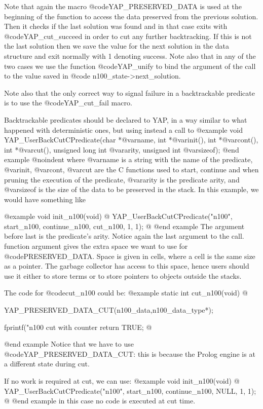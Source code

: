 {{{{{{{{{Note that again the macro @code{YAP_PRESERVED_DATA} is used at the
beginning of the function to access the data preserved from the previous
solution.  Then it checks if the last solution was found and in that
case exits with @code{YAP_cut_succeed} in order to cut any further
backtracking.  If this is not the last solution then we save the value
for the next solution in the data structure and exit normally with 1
denoting success. Note also that in any of the two cases we use the
function @code{YAP_unify} to bind the argument of the call to the value
saved in @code{ n100_state->next_solution}.


Note also that the only correct way to signal failure in a backtrackable
predicate is to use the @code{YAP_cut_fail} macro.

Backtrackable predicates should be declared to YAP, in a way
similar to what happened with deterministic ones, but using instead a
call to
@example
      void YAP_UserBackCutCPredicate(char *@var{name},
                 int *@var{init}(), int *@var{cont}(), int *@var{cut}(),
                 unsigned long int @var{arity}, unsigned int @var{sizeof});
@end example
@noindent
where @var{name} is a string with the name of the predicate, @var{init},
@var{cont}, @var{cut} are the C functions used to start, continue and
when pruning the execution of the predicate, @var{arity} is the
predicate arity, and @var{sizeof} is the size of the data to be
preserved in the stack. In this example, we would have something like

@example
void
init_n100(void)
@{
  YAP_UserBackCutCPredicate("n100", start_n100, continue_n100, cut_n100, 1, 1);
@}
@end example
The argument before last is the predicate's arity. Notice again the
last argument to the call. function argument gives the extra space we
want to use for @code{PRESERVED_DATA}. Space is given in cells, where
a cell is the same size as a pointer. The garbage collector has access
to this space, hence users should use it either to store terms or to
store pointers to objects outside the stacks.

The code for @code{cut_n100} could be:
@example
static int cut_n100(void)
@{
  YAP_PRESERVED_DATA_CUT(n100_data,n100_data_type*);

  fprintf("n100 cut with counter %
  return TRUE;
@}
@end example
Notice that we have to use @code{YAP_PRESERVED_DATA_CUT}: this is
because the Prolog engine is at a different state during cut.

If no work is required at cut, we can use:
@example
void
init_n100(void)
@{
  YAP_UserBackCutCPredicate("n100", start_n100, continue_n100, NULL, 1, 1);
@}
@end example
in this case no code is executed at cut time.

}}}}}}}}}
